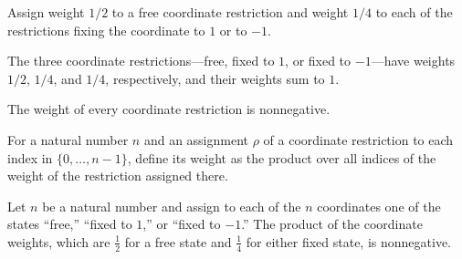 \begin{definition}
\label{FABL.coordRestrictionWeight}
\leanok
{}
Assign weight $1/2$ to a free coordinate restriction and weight $1/4$ to each of the
restrictions fixing the coordinate to $1$ or to $-1$.
\end{definition}

\begin{theorem}
\label{FABL.sum_coordRestrictionWeight}
\leanok
{}
The three coordinate restrictions—free, fixed to $1$, or fixed to $-1$—have weights
$1/2$, $1/4$, and $1/4$, respectively, and their weights sum to $1$.
\end{theorem}

\begin{theorem}
\label{FABL.coordRestrictionWeight_nonneg}
\leanok
{}
The weight of every coordinate restriction is nonnegative.
\end{theorem}

\begin{definition}
\label{FABL.restrictionAssignmentWeight}
\leanok
{}
For a natural number $n$ and an assignment $\rho$ of a coordinate restriction to each
index in $\{0,\ldots,n-1\}$, define its weight as the product over all indices of the
weight of the restriction assigned there.
\end{definition}

\begin{theorem}
\label{FABL.restrictionAssignmentWeight_nonneg}
\leanok
{}
Let $n$ be a natural number and assign to each of the $n$ coordinates one of the states
“free,” “fixed to $1$,” or “fixed to $-1$.” The product of the coordinate weights, which
are $\frac12$ for a free state and $\frac14$ for either fixed state, is nonnegative.
\end{theorem}

